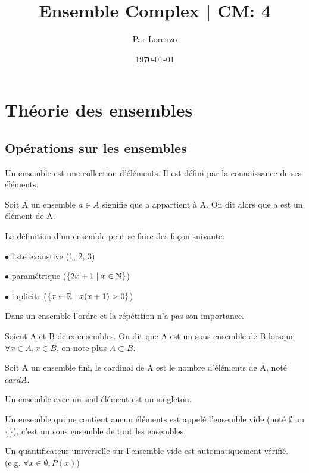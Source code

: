\documentclass[a4paper, 12pt]{article}
\title{Ensemble Complex | CM: 4}
\author{Par Lorenzo}
\date{\today}
\begin{document}
\maketitle

\section{Théorie des ensembles}

\subsection{Opérations sur les ensembles}

\begin{definition}
    Un ensemble est une collection d'éléments. Il est défini par la connaissance de ses éléments.

    Soit A un ensemble $a \in A$ signifie que a appartient à A. On dit alors que a est un élément de A.
\end{definition}

\begin{remark}
    La définition d'un ensemble peut se faire des façon suivante:

    \item $\bullet$ liste exaustive ({1, 2, 3})
    \item $\bullet$ paramétrique ($\{2x + 1 \mid x \in \mathbb{N}\}$)
    \item $\bullet$ inplicite ($\{x \in \mathbb{R} \mid x(x+1) > 0\}$)
\end{remark}

\begin{remark}
    Dans un ensemble l'ordre et la répétition n'a pas son importance.
\end{remark}

\begin{definition}
    Soient A et B deux ensembles. On dit que A est un sous-ensemble de B lorsque $\forall x \in A, x \in B$, on note plus $A \subset B$.

    Soit A un ensemble fini, le cardinal de A est le nombre d'éléments de A, noté $card A$.

    Un ensemble avec un seul élément est un singleton.

    Un ensemble qui ne contient aucun éléments est appelé l'ensemble vide (noté $\emptyset$ ou \{\}),
    c'est un sous ensemble de tout les ensembles.
\end{definition}

\begin{remark}
    Un quantificateur universelle sur l'ensemble vide est automatiquement vérifié.
    (e.g. $\forall x \in \emptyset, P(x)$)
\end{remark}
\end{document}
